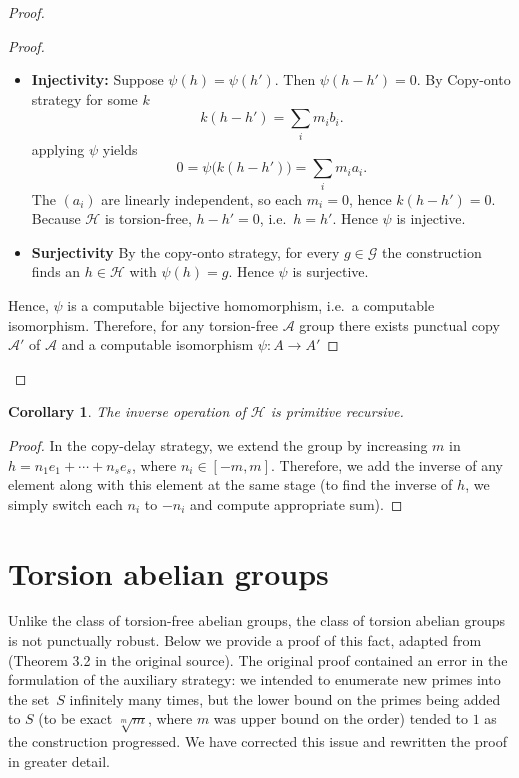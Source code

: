 \documentclass{pracalicmgr2025}
\theoremstyle{plain}            %
\newtheorem{corollary}[theorem]{Corollary}
\theoremstyle{remark}           %
\theoremstyle{definition}       %
\begin{document}
\begin{proof}
\begin{proof}
\begin{itemize}
    \item \textbf{Injectivity:} Suppose $\psi(h)=\psi(h')$. Then $\psi(h-h')=0$. By Copy-onto strategy for some $k$ 
    $$
    k(h-h')=\sum_i m_i b_i.
    $$
    applying $\psi$ yields
    $$
    0=\psi\big(k(h-h')\big)=\sum_i m_i a_i.
    $$
    The $(a_i)$ are linearly independent, so each $m_i=0$, hence $k(h-h')=0$.  
    Because $\mathcal H$ is torsion-free, $h-h'=0$, i.e.\ $h=h'$. Hence $\psi$ is injective.
    
    \item \textbf{Surjectivity} By the copy-onto strategy, for every $g\in\mathcal G$ the construction finds an $h\in\mathcal H$ with $\psi(h)=g$. Hence $\psi$ is surjective.
    \end{itemize}
    Hence, $\psi$ is a computable bijective homomorphism, i.e.\ a computable isomorphism. Therefore, for any torsion-free $\mathcal{A}$ group there exists punctual copy $\mathcal{A}'$ of $\mathcal{A}$ and a computable isomorphism $\psi: A \to A'$
    
    \end{proof}

\end{proof}
    \begin{corollary}
     \label{torsion free lemma invers p.r}
     The inverse operation of $\mathcal{H}$ is primitive recursive.
    \end{corollary}
\begin{proof}
    In the copy-delay strategy, we extend the group by increasing $m$ in $h = n_1 e_1 + \cdots + n_s e_s$, where $n_i \in [-m, m]$. Therefore, we add the inverse of any element along with this element at the same stage (to find the inverse of $h$, we simply switch each $n_i$ to $-n_i$ and compute appropriate sum).
\end{proof}
\bigskip
\section{Torsion abelian groups}
Unlike the class of torsion-free abelian groups, the class of torsion abelian groups is not punctually robust. Below we provide a proof of this fact, adapted from \cite{3} (Theorem 3.2 in the original source). The original proof contained an error in the formulation of the auxiliary strategy: we intended to enumerate new primes into the set~$S$ infinitely many times, but the lower bound on the primes being added to $S$ (to be exact $\sqrt[m]{m}$, where $m$ was upper bound on the order) tended to $1$ as the construction progressed. We have corrected this issue and rewritten the proof in greater detail. 
\end{document}
